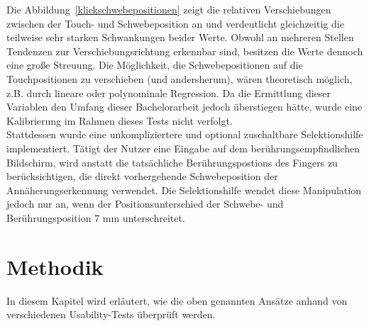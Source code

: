 \documentclass[12pt,numbers=noenddot,parskip,bibliography=totocnumbered,listof=totocnumbered]{scrreprt}
\begin{document}
Die Abbildung~\ref{klickschwebepositionen} zeigt die relativen Verschiebungen zwischen der Touch- und Schwebeposition an und verdeutlicht gleichzeitig die teilweise sehr starken Schwankungen beider Werte. Obwohl an mehreren Stellen Tendenzen zur Verschiebungsrichtung erkennbar sind, besitzen die Werte dennoch eine große Streuung. Die Möglichkeit, die Schwebepositionen auf die Touchpositionen zu verschieben (und andersherum), wären theoretisch möglich, z.B. durch lineare oder polynominale Regression. Da die Ermittlung dieser Variablen den Umfang dieser Bachelorarbeit jedoch überstiegen hätte, wurde eine Kalibrierung im Rahmen dieses Tests nicht verfolgt.\\
Stattdessen wurde eine unkompliziertere und optional zuschaltbare Selektionshilfe implementiert. Tätigt der Nutzer eine Eingabe auf dem berührungsempfindlichen Bildschirm, wird anstatt die tatsächliche Berührungspostions des Fingers zu berücksichtigen, die direkt vorhergehende Schwebeposition der Annäherungserkennung verwendet. Die Selektionshilfe wendet diese Manipulation jedoch nur an, wenn der Positionsunterschied der Schwebe- und Berührungsposition $7$ mm unterschreitet.

\chapter{Methodik}
In diesem Kapitel wird erläutert, wie die oben genannten Ansätze anhand von verschiedenen Usability-Tests überprüft werden.
\end{document}
